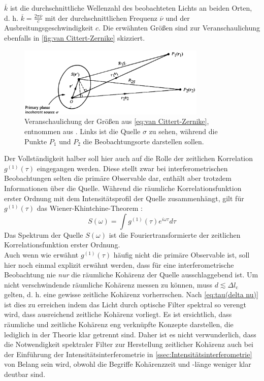 $\overline{k}$ ist die durchschnittliche Wellenzahl des beobachteten Lichts an beiden Orten, d. h. $\overline{k} = \frac{2\pi\overline{\nu}}{c}$ mit der durchschnittlichen Frequenz $\overline{\nu}$ und der Ausbreitungsgeschwindigkeit $c$. 
Die erwähnten Größen sind zur Veranschaulichung ebenfalls in \autoref{fig:van Cittert-Zernike} skizziert. 
\begin{figure}[h]
    \centering
    \includegraphics[width=0.8\textwidth]{images/Theorie/Mandel_4.12.png}
    \caption{Veranschaulichung der Größen aus \autoref{eq:van Cittert-Zernike}, entnommen aus \cite[Abb. 4.12]{mandelOpticalCoherenceQuantum1995}. Links ist die Quelle $\sigma$ zu sehen, während die Punkte $P_1$ und $P_2$ die Beobachtungsorte darstellen sollen. }
    \label{fig:van Cittert-Zernike}
\end{figure}
Der Vollständigkeit halber soll hier auch auf die Rolle der zeitlichen Korrelation $g^{(1)}(\tau)$ eingegangen werden. 
Diese stellt zwar bei interferometrischen Beobachtungen selten die primäre Observable dar, enthält aber trotzdem Informationen über die Quelle. 
Während die räumliche Korrelationsfunktion erster Ordnung mit dem Intensitätsprofil der Quelle zusammenhängt, gilt für $g^{(1)}(\tau)$ das Wiener-Khintchine-Theorem \cite{lasseguesFieldIntensityCorrelations2022}:
\begin{equation}
    S(\omega) =  \int g^{(1)}(\tau) e^{i\omega\tau} d\tau
\end{equation}
Das Spektrum der Quelle $S(\omega)$ ist die Fouriertransformierte der zeitlichen Korrelationsfunktion erster Ordnung. \\
Auch wenn wie erwähnt $g^{(1)}(\tau)$ häufig nicht die primäre Observable ist, soll hier noch einmal explizit erwähnt werden, dass für eine interferometrische Beobachtung nie \emph{nur} die räumliche Kohärenz der Quelle ausschlaggebend ist. 
Um nicht verschwindende räumliche Kohärenz messen zu können, muss $d\lesssim \Delta l_\mathrm{c}$ gelten, d. h. eine gewisse zeitliche Kohärenz vorherrschen. 
Nach \autoref{eq:tau(delta nu)} ist dies zu erreichen indem das Licht durch optische Filter spektral so verengt wird, dass ausreichend zeitliche Kohärenz vorliegt. 
Es ist ersichtlich, dass räumliche und zeitliche Kohärenz eng verknüpfte Konzepte darstellen, die lediglich in der Theorie klar getrennt sind. 
Daher ist es nicht verwunderlich, dass die Notwendigkeit spektraler Filter zur Herstellung zeitlicher Kohärenz auch bei der Einführung der Intensitätsinterferometrie in \autoref{ssec:Intensitätsinterferometrie} von Belang sein wird, obwohl die Begriffe Kohärenzzeit und -länge weniger klar deutbar sind. \\

